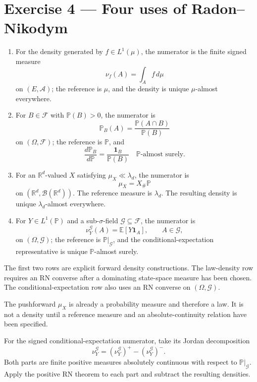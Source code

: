 \section*{Exercise 4 — Four uses of Radon--Nikodym}

\begin{enumerate}
  \item For the density generated by $f\in L^1(\mu)$, the numerator is the finite signed measure
  \[
  \nu_f(A)=\int_Af\,d\mu
  \]
  on $(E,\mathcal A)$; the reference is $\mu$, and the density is unique $\mu$-almost everywhere.

  \item For $B\in\mathcal F$ with $\mathbb P(B)>0$, the numerator is
  \[
  \mathbb P_B(A)
  =
  \frac{\mathbb P(A\cap B)}{\mathbb P(B)}
  \]
  on $(\Omega,\mathcal F)$; the reference is $\mathbb P$, and
  \[
  \frac{d\mathbb P_B}{d\mathbb P}
  =
  \frac{\mathbf 1_B}{\mathbb P(B)}
  \quad\mathbb P\text{-almost surely}.
  \]

  \item For an $\mathbb R^d$-valued $X$ satisfying $\mu_X\ll\lambda_d$, the numerator is
  \[
  \mu_X=X_\#\mathbb P
  \]
  on $(\mathbb R^d,\mathcal B(\mathbb R^d))$. The reference measure is $\lambda_d$. The resulting density is unique $\lambda_d$-almost everywhere.

  \item For $Y\in L^1(\mathbb P)$ and a sub-$\sigma$-field $\mathcal G\subseteq\mathcal F$, the numerator is
  \[
  \nu_Y^{\mathcal G}(A)
  =
  \mathbb E[Y\mathbf 1_A],
  \qquad A\in\mathcal G,
  \]
  on $(\Omega,\mathcal G)$; the reference is $\mathbb P|_{\mathcal G}$, and the conditional-expectation representative is unique $\mathbb P$-almost surely.
\end{enumerate}

The first two rows are explicit forward density constructions. The law-density row requires an RN converse after a dominating state-space measure has been chosen. The conditional-expectation row also uses an RN converse on $(\Omega,\mathcal G)$.

The pushforward $\mu_X$ is already a probability measure and therefore a law. It is not a density until a reference measure and an absolute-continuity relation have been specified.

For the signed conditional-expectation numerator, take its Jordan decomposition
\[
\nu_Y^{\mathcal G}
=
(\nu_Y^{\mathcal G})^+
-
(\nu_Y^{\mathcal G})^-.
\]
Both parts are finite positive measures absolutely continuous with respect to $\mathbb P|_{\mathcal G}$. Apply the positive RN theorem to each part and subtract the resulting densities.

